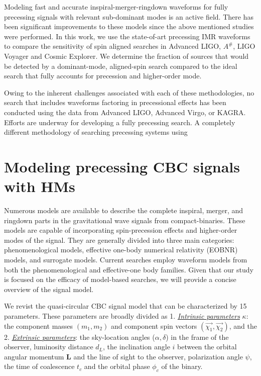 Modeling fast and accurate inspiral-merger-ringdown waveforms for fully precessing signals with relevant sub-dominant modes is an active field. There has been significant improvements to these models since the above mentioned studies were performed. In this work, we use the state-of-art precessing IMR waveforms to compare the sensitivity of spin aligned searches in Advanced LIGO, $A^{\#}$, LIGO Voyager and Cosmic Explorer. We determine the fraction of sources that would be detected by a dominant-mode, aligned-spin search compared to the ideal search that fully accounts for precession and higher-order mode.   


Owing to the inherent challenges associated with each of these methodologies, no search that includes waveforms factoring in precessional effects has been conducted using the data from Advanced LIGO, Advanced Virgo, or KAGRA. Efforts are underway for developing a fully precessing search. A completely different methodology of searching precessing systems using     

\section{Modeling precessing CBC signals with HMs}

Numerous models are available to describe the complete inspiral, merger, and ringdown parts in the gravitational wave signals from compact-binaries. These models are capable of incorporating spin-precession effects and higher-order modes of the signal. They are generally divided into three main categories: phenomenological models, effective one-body numerical relativity (EOBNR) models, and surrogate models. Current searches employ waveform models from both the phenomenological and effective-one body families. Given that our study is focused on the efficacy of model-based searches, we will provide a concise overview of the signal model. 

We revist the quasi-circular CBC signal model that can be characterized by 15 parameters. These parameters are broadly divided as 1. \uline{\textit{Intrinsic parameters}} $\kappa$: the component masses $(m_1, m_2)$ and component spin vectors $(\Vec{\chi_1}, \Vec{\chi_2})$, and the 2. \underline{\textit{Extrinsic parameters}}: the sky-location angles ($\alpha, \delta$) in the frame of the observer, luminosity distance $d_L$, the inclination angle $i$ between the orbital angular momentum \textbf{L} and the line of sight to the observer, polarization angle $\psi$, the time of coalescence $t_c$ and the orbital phase $\phi_c$ of the binary.

